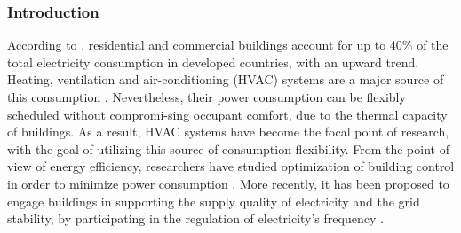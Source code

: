 %
%


\subsubsection{Introduction}
\label{sec:Introduction}
According to \cite{Perez-Lombard:2008aa}, residential and commercial buildings account for up to 40\% of the total electricity consumption in developed countries, with an upward trend. Heating, ventilation and air-conditioning (HVAC) systems are a major source of this consumption \cite{:aa}. %
Nevertheless, their power consumption can be flexibly scheduled without compromi-sing occupant comfort, due to the thermal capacity of buildings. As a result, HVAC systems have become the focal point of research, with the goal of utilizing this source of consumption flexibility. From the point of view of energy efficiency, researchers have studied optimization of building control in order to minimize power consumption \cite{Siroky:2011aa, Parisio:2014aa}.  %
More recently, it has been proposed to engage buildings in supporting the supply quality of electricity and the grid stability, by participating in the regulation of electricity's frequency \cite{Balandat:2014aa, Lin:2015aa, Vrettos:2014aa, Baccino:2014aa}.


